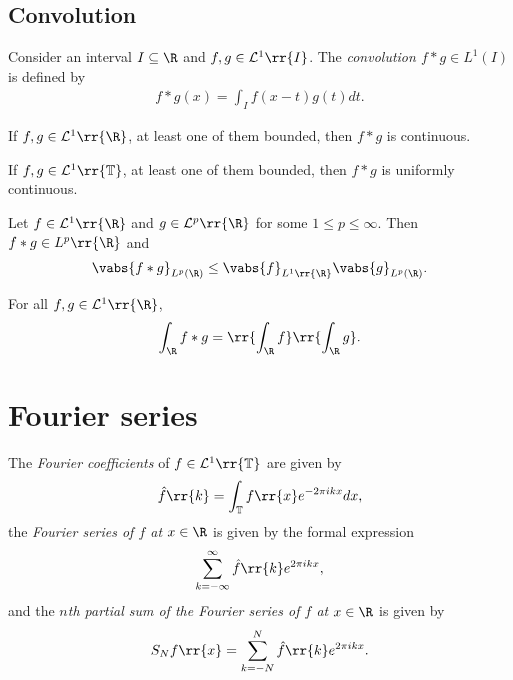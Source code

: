 \documentclass{article}
\begin{document}
\subsection{Convolution}

\begin{definition}
  Consider an interval $I\subseteq\R$ and $f,g\in\mathcal L^1\rr{I}$.
  The \emph{convolution $f*g\in L^1(I)$} is defined by
  \begin{align*}
    f*g(x) = \int_I f(x-t)g(t)dt.
  \end{align*}
\end{definition}

\begin{lemma}
  If $f,g\in\mathcal L^1\rr{\R}$, at least one of them bounded, then
  $f*g$ is continuous.
\end{lemma}

\begin{lemma}
  If $f,g\in\mathcal L^1\rr{\mathbb T}$, at least one of them bounded, then
  $f*g$ is uniformly continuous.
\end{lemma}

\begin{theorem}[Young]
  Let $f\in\mathcal L^1\rr{\R}$ and $g\in\mathcal L^{p}\rr{\R}$
  for some $1\leq p\leq\infty$. Then $f*g\in L^p\rr{\R}$ and
  \begin{align*}
    \vabs{f*g}_{L^p(\R)} \leq \vabs{f}_{L^1\rr{\R}}\vabs{g}_{L^p(\R)}.
  \end{align*}
\end{theorem}

\begin{theorem}
  For all $f,g\in\mathcal L^1\rr{\R}$,
  \begin{align*}
    \int_\R f*g = \rr{\int_\R f}\rr{\int_\R g}.
  \end{align*}
\end{theorem}

\section{Fourier series}

\begin{definition}
  The \emph{Fourier coefficients} of $f\in\mathcal L^1\rr{\mathbb T}$ are given by
  \begin{align}\label{eq:fourier_coefficients}
    \hat f\rr{k} = \int_{\mathbb T} f\rr{x} e^{-2\pi i k x} dx,
  \end{align}
  the \emph{Fourier series of $f$ at $x\in\R$} is given by the formal expression
  \begin{align*}
    \sum_{k=-\infty}^\infty \hat f\rr{k} e^{2\pi i k x},
  \end{align*}
  and the \emph{$n$th partial sum of the Fourier series of $f$ at $x\in\R$} is
  given by
  \begin{align*}
    S_N f\rr{x} = \sum_{k=-N}^N \hat f\rr{k}e^{2\pi i k x}.
  \end{align*}
\end{definition}
\end{document}

